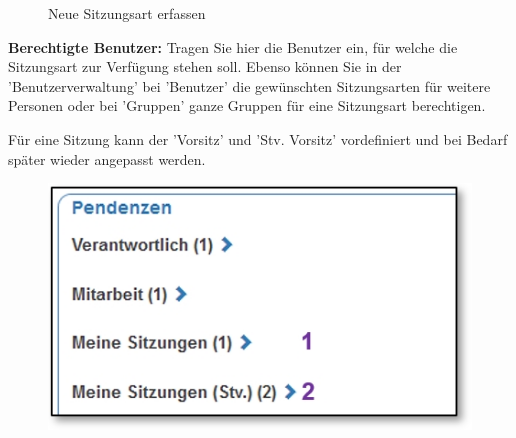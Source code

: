\begin{figure}[H]
\caption{Neue Sitzungsart erfassen}
\end{figure}

\textbf{Berechtigte Benutzer:} Tragen Sie hier die Benutzer ein, für welche die Sitzungsart zur Verfügung stehen soll. Ebenso können Sie in der 'Benutzerverwaltung' bei 'Benutzer' die gewünschten Sitzungsarten für weitere Personen oder bei 'Gruppen' ganze Gruppen für eine Sitzungsart berechtigen.

\vspace{\baselineskip}

Für eine Sitzung kann der 'Vorsitz' und 'Stv. Vorsitz' vordefiniert und bei Bedarf später wieder angepasst
werden.

\vspace{\baselineskip}

\begin{figure}   %
  \vspace{-25pt}      %
  \begin{center}
    \includegraphics[width=1\linewidth]{../chapters/13_Konfigurationen/pictures/Sitzungsart_Zuweisung.jpg}
  \end{center}
  \vspace{-20pt}
  \vspace{-10pt}
\end{figure}

